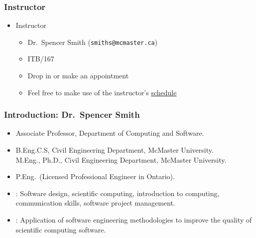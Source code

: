 \documentclass[t,12pt,numbers,fleqn]{beamer}
\begin{document}

\begin{frame}
\frametitle{Instructor}

\begin{itemize}

\item Instructor
\begin{itemize}
\item Dr.\ Spencer Smith ({\tt smiths@mcmaster.ca})
\item ITB/167
\item Drop in or make an appointment
  \item Feel free to make use of the instructor's
    \href{http://www.cas.mcmaster.ca/~smiths/SSmithSchedule.html} {schedule}
\end{itemize}

\end{itemize}

\end{frame}


\begin{frame}
\frametitle{Introduction: Dr.\ Spencer Smith} 
\begin{itemize}
 
   \item Associate Professor, Department of Computing and Software.
   
   \item B.Eng.C.S, Civil Engineering Department, McMaster University. \\
         M.Eng., Ph.D., Civil Engineering Department, McMaster University.
 
   \item P.Eng.~(Licensed Professional Engineer in Ontario).
 
   \item {}: Software design, scientific computing,
     introduction to computing, communication skills, software project
     management.
 
   \item {}: Application of software engineering methodologies
     to improve the quality of scientific computing software.
 
 \end{itemize}

\end{frame}   
\end{document}
